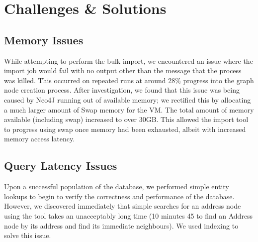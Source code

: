 \section{Challenges \& Solutions}\label{neo4j-challenges}
\subsection{Memory Issues}
While attempting to perform the bulk import, we encountered an issue where the import job would fail with no output other than the message that the process was killed. This occurred on repeated runs at around 28\% progress into the graph node creation process. After investigation, we found that this issue was being caused by Neo4J running out of available memory; we rectified this by allocating a much larger amount of Swap memory for the VM. The total amount of memory available (including swap) increased to over 30GB. This allowed the import tool to progress using swap once memory had been exhausted, albeit with increased memory access latency.

\subsection{Query Latency Issues} 
Upon a successful population of the database, we performed simple entity lookups to begin to verify the correctness and performance of the database. However, we discovered immediately that simple searches for an address node using the tool takes an unacceptably long time (10 minutes 45 to find an Address node by its address and find its immediate neighbours). We used indexing to solve this issue. 


